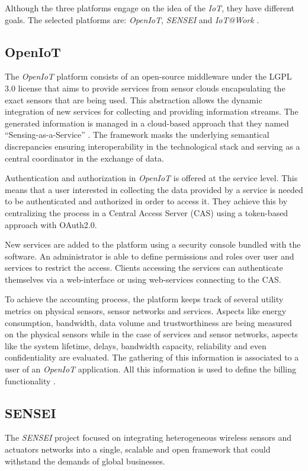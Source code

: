 \documentclass[journal]{IEEEtran}
\begin{document}
  Although the three platforms engage on the idea of the \emph{IoT}, they have different goals. The selected platforms are: \emph{OpenIoT}, \emph{SENSEI}  and \emph{IoT@Work} \cite{OpenIoT}\cite{SENSEI}\cite{IoTWork}.

  \subsection{OpenIoT}

  The \emph{OpenIoT} platform \cite{OpenIoTWeb} consists of an open-source middleware under the LGPL 3.0 license that aims to provide services from sensor clouds encapsulating the exact sensors that are being used. This abstraction allows the dynamic integration of new services for collecting and providing information streams. The generated information is managed in a cloud-based approach that they named ``Sensing-as-a-Service'' \cite{Baldini2012}.  The framework masks the underlying semantical discrepancies ensuring interoperability in the technological stack and serving as a central coordinator in the exchange of data.

  Authentication and authorization in \emph{OpenIoT} is offered at the service level. This means that a user interested in collecting the data provided by a service is needed to be authenticated and authorized in order to access it. They achieve this by centralizing the process in a Central Access Server (CAS) using a token-based approach with OAuth2.0. 

  New services are added to the platform using a security console bundled with the software. An administrator is able to define permissions and roles over user and services to restrict the access. Clients accessing the services can authenticate themselves via a web-interface or using web-services connecting to the CAS.

  To achieve the accounting process, the platform keeps track of several utility metrics on physical sensors, sensor networks and services. Aspects like energy consumption, bandwidth, data volume and trustworthiness are being measured on the physical sensors while in the case of services and sensor networks, aspects like the system lifetime, delays, bandwidth capacity, reliability and even confidentiality are evaluated. The gathering of this information is associated to a user of an \emph{OpenIoT} application. All this information is used to define the billing functionality \cite{Calbimonte}.

  \subsection{SENSEI}
  The \emph{SENSEI} project \cite{SENSEIWeb} focused on integrating heterogeneous wireless sensors and actuators networks into a single, scalable and open framework that could withstand the demands of global businesses.
  
\end{document}
